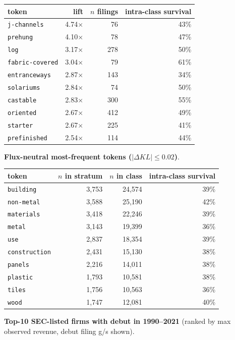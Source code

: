 \begin{tabular}{lrrr}
\toprule
token & lift & $n$ filings & intra-class survival \\
\midrule
\texttt{j-channels} & 4.74$\times$ & 76 & 43\% \\
\texttt{prehung} & 4.10$\times$ & 78 & 47\% \\
\texttt{log} & 3.17$\times$ & 278 & 50\% \\
\texttt{fabric-covered} & 3.04$\times$ & 79 & 61\% \\
\texttt{entranceways} & 2.87$\times$ & 143 & 34\% \\
\texttt{solariums} & 2.84$\times$ & 74 & 50\% \\
\texttt{castable} & 2.83$\times$ & 300 & 55\% \\
\texttt{oriented} & 2.67$\times$ & 412 & 49\% \\
\texttt{starter} & 2.67$\times$ & 225 & 41\% \\
\texttt{prefinished} & 2.54$\times$ & 114 & 44\% \\
\bottomrule
\end{tabular}

\textbf{Flux-neutral most-frequent tokens ($|\Delta KL|\leq 0.02$)}.

\begin{tabular}{lrrr}
\toprule
token & $n$ in stratum & $n$ in class & intra-class survival \\
\midrule
\texttt{building} & 3,753 & 24,574 & 39\% \\
\texttt{non-metal} & 3,588 & 25,190 & 42\% \\
\texttt{materials} & 3,418 & 22,246 & 39\% \\
\texttt{metal} & 3,143 & 19,399 & 36\% \\
\texttt{use} & 2,837 & 18,354 & 39\% \\
\texttt{construction} & 2,431 & 15,130 & 38\% \\
\texttt{panels} & 2,216 & 14,011 & 38\% \\
\texttt{plastic} & 1,793 & 10,581 & 38\% \\
\texttt{tiles} & 1,756 & 10,563 & 36\% \\
\texttt{wood} & 1,747 & 12,081 & 40\% \\
\bottomrule
\end{tabular}

\textbf{Top-10 SEC-listed firms with debut in 1990--2021} (ranked by max observed revenue, debut filing g/s shown).

